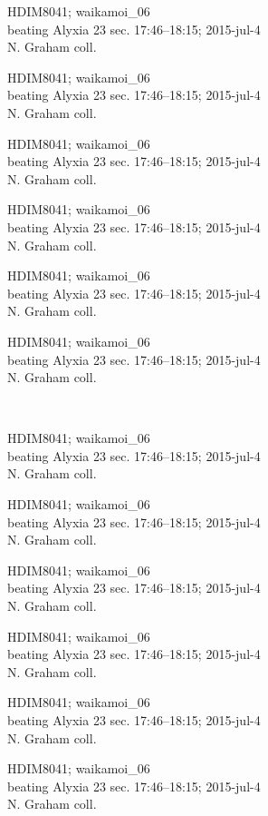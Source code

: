 \documentclass[2pt]{extarticle}
\begin{document}
\noindent
\parbox{0.16\textwidth}{\tiny \raggedright \rule[-0.3\baselineskip]{0pt}{10pt}HDIM8041; waikamoi\_06\\ beating Alyxia 23 sec. 17:46--18:15; 2015-jul-4\\ N. Graham coll.}
\parbox{0.16\textwidth}{\tiny \raggedright \rule[-0.3\baselineskip]{0pt}{10pt}HDIM8041; waikamoi\_06\\ beating Alyxia 23 sec. 17:46--18:15; 2015-jul-4\\ N. Graham coll.}
\parbox{0.16\textwidth}{\tiny \raggedright \rule[-0.3\baselineskip]{0pt}{10pt}HDIM8041; waikamoi\_06\\ beating Alyxia 23 sec. 17:46--18:15; 2015-jul-4\\ N. Graham coll.}
\parbox{0.16\textwidth}{\tiny \raggedright \rule[-0.3\baselineskip]{0pt}{10pt}HDIM8041; waikamoi\_06\\ beating Alyxia 23 sec. 17:46--18:15; 2015-jul-4\\ N. Graham coll.}
\parbox{0.16\textwidth}{\tiny \raggedright \rule[-0.3\baselineskip]{0pt}{10pt}HDIM8041; waikamoi\_06\\ beating Alyxia 23 sec. 17:46--18:15; 2015-jul-4\\ N. Graham coll.}
\parbox{0.16\textwidth}{\tiny \raggedright \rule[-0.3\baselineskip]{0pt}{10pt}HDIM8041; waikamoi\_06\\ beating Alyxia 23 sec. 17:46--18:15; 2015-jul-4\\ N. Graham coll.} \\ 
\vspace{0.001in} 

\noindent
\parbox{0.16\textwidth}{\tiny \raggedright \rule[-0.3\baselineskip]{0pt}{10pt}HDIM8041; waikamoi\_06\\ beating Alyxia 23 sec. 17:46--18:15; 2015-jul-4\\ N. Graham coll.}
\parbox{0.16\textwidth}{\tiny \raggedright \rule[-0.3\baselineskip]{0pt}{10pt}HDIM8041; waikamoi\_06\\ beating Alyxia 23 sec. 17:46--18:15; 2015-jul-4\\ N. Graham coll.}
\parbox{0.16\textwidth}{\tiny \raggedright \rule[-0.3\baselineskip]{0pt}{10pt}HDIM8041; waikamoi\_06\\ beating Alyxia 23 sec. 17:46--18:15; 2015-jul-4\\ N. Graham coll.}
\parbox{0.16\textwidth}{\tiny \raggedright \rule[-0.3\baselineskip]{0pt}{10pt}HDIM8041; waikamoi\_06\\ beating Alyxia 23 sec. 17:46--18:15; 2015-jul-4\\ N. Graham coll.}
\parbox{0.16\textwidth}{\tiny \raggedright \rule[-0.3\baselineskip]{0pt}{10pt}HDIM8041; waikamoi\_06\\ beating Alyxia 23 sec. 17:46--18:15; 2015-jul-4\\ N. Graham coll.}
\parbox{0.16\textwidth}{\tiny \raggedright \rule[-0.3\baselineskip]{0pt}{10pt}HDIM8041; waikamoi\_06\\ beating Alyxia 23 sec. 17:46--18:15; 2015-jul-4\\ N. Graham coll.} \\ 
\vspace{0.001in} 
\end{document}
